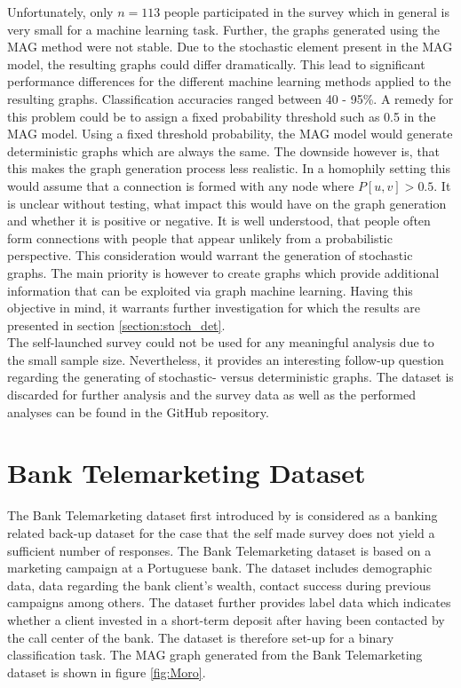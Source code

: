   \noindent Unfortunately, only $n=113$ people participated in the survey which 
  in general is very small for a machine learning task.
  Further, the graphs generated using the MAG method were not stable. Due to
  the stochastic element present in the MAG model, the resulting graphs could
  differ dramatically. This lead to significant performance differences for the
  different machine learning methods applied to the resulting graphs.
  Classification accuracies ranged between 40 - 95\%. A remedy for this 
  problem could be to assign a fixed probability threshold such as 0.5 in the 
  MAG model. Using a fixed threshold probability, the MAG model would 
  generate deterministic graphs which are always the same. The downside however 
  is, that this makes the graph generation process less realistic. In a
  homophily setting this would assume that a connection is formed with any node 
  where $P[u,v]>0.5$. It is unclear without testing, what impact this would
  have on the graph generation and whether it is positive or negative. It is
  well understood, that people often form connections with people that appear
  unlikely from a probabilistic perspective. This consideration would warrant
  the generation of stochastic graphs. The main priority is however to create
  graphs which provide additional information that can be exploited via graph
  machine learning. Having this objective in mind, it warrants further
  investigation for which the results are presented in section 
  \ref{section:stoch_det}. \\

  \noindent The self-launched survey could not be used for any meaningful
  analysis due to the small sample size. Nevertheless, it provides an
  interesting follow-up question regarding the generating of
  stochastic- versus deterministic graphs. The dataset is discarded for
  further analysis and the survey data as well as the performed analyses can be
  found in the GitHub repository. 

  \section{Bank Telemarketing Dataset}
  \label{section:bank_data}

  The Bank Telemarketing dataset first introduced by 
  \cite{moro2011using,moro2014data} is considered as a banking related back-up 
  dataset for the case that the self made survey does not yield a sufficient 
  number of responses. The Bank Telemarketing dataset is based on a marketing 
  campaign at a Portuguese bank. The dataset includes demographic data, data 
  regarding the bank client's wealth, contact success during previous campaigns
  among others. The dataset further provides label data which indicates whether 
  a client invested in a short-term deposit after having been contacted by the
  call center of the bank. The dataset is therefore set-up for a binary 
  classification task. The MAG graph generated from the Bank Telemarketing 
  dataset is shown in figure \ref{fig:Moro}.
 
